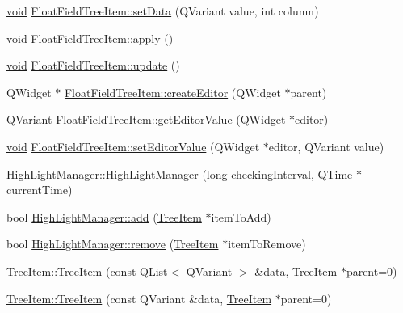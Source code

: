 \begin{DoxyCompactItemize}
\hyperlink{group___u_a_v_objects_plugin_ga444cf2ff3f0ecbe028adce838d373f5c}{void} \hyperlink{group___u_a_v_object_browser_plugin_ga3af0226a4922471e79087adc2d268710}{\-Float\-Field\-Tree\-Item\-::set\-Data} (\-Q\-Variant value, int column)
\item 
\hyperlink{group___u_a_v_objects_plugin_ga444cf2ff3f0ecbe028adce838d373f5c}{void} \hyperlink{group___u_a_v_object_browser_plugin_ga4d5f38d08a56c3392536899254daf7d8}{\-Float\-Field\-Tree\-Item\-::apply} ()
\item 
\hyperlink{group___u_a_v_objects_plugin_ga444cf2ff3f0ecbe028adce838d373f5c}{void} \hyperlink{group___u_a_v_object_browser_plugin_gaf8663356ac74e46312ee8bdfe6470d74}{\-Float\-Field\-Tree\-Item\-::update} ()
\item 
\-Q\-Widget $\ast$ \hyperlink{group___u_a_v_object_browser_plugin_ga2762101ef0435023c73583b23393a8c2}{\-Float\-Field\-Tree\-Item\-::create\-Editor} (\-Q\-Widget $\ast$parent)
\item 
\-Q\-Variant \hyperlink{group___u_a_v_object_browser_plugin_gac22e37813e460949e795d4b18c110293}{\-Float\-Field\-Tree\-Item\-::get\-Editor\-Value} (\-Q\-Widget $\ast$editor)
\item 
\hyperlink{group___u_a_v_objects_plugin_ga444cf2ff3f0ecbe028adce838d373f5c}{void} \hyperlink{group___u_a_v_object_browser_plugin_gadf07cae542668ec439bf1514f07e4983}{\-Float\-Field\-Tree\-Item\-::set\-Editor\-Value} (\-Q\-Widget $\ast$editor, \-Q\-Variant value)
\item 
\hyperlink{group___u_a_v_object_browser_plugin_ga3e918ce06821d7300b56319253da49cb}{\-High\-Light\-Manager\-::\-High\-Light\-Manager} (long checking\-Interval, \-Q\-Time $\ast$current\-Time)
\item 
bool \hyperlink{group___u_a_v_object_browser_plugin_ga61c9f35430a5668bcab80f6840ea0f93}{\-High\-Light\-Manager\-::add} (\hyperlink{class_tree_item}{\-Tree\-Item} $\ast$item\-To\-Add)
\item 
bool \hyperlink{group___u_a_v_object_browser_plugin_gac8c19321b7e84ad6ba7a857cf48b21a8}{\-High\-Light\-Manager\-::remove} (\hyperlink{class_tree_item}{\-Tree\-Item} $\ast$item\-To\-Remove)
\item 
\hyperlink{group___u_a_v_object_browser_plugin_gaee288dea1233cde85e888cd709a5385e}{\-Tree\-Item\-::\-Tree\-Item} (const \-Q\-List$<$ \-Q\-Variant $>$ \&data, \hyperlink{class_tree_item}{\-Tree\-Item} $\ast$parent=0)
\item 
\hyperlink{group___u_a_v_object_browser_plugin_ga18da596c178ccc1c830ac82d1896be1d}{\-Tree\-Item\-::\-Tree\-Item} (const \-Q\-Variant \&data, \hyperlink{class_tree_item}{\-Tree\-Item} $\ast$parent=0)

\end{DoxyCompactItemize}
